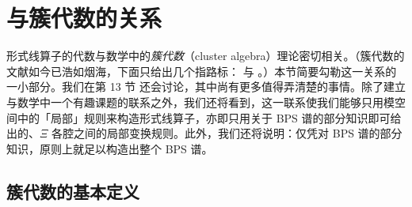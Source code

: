 
\section{与簇代数的关系}
\label{sec:Cluster-Algebras}

形式线算子的代数与数学中的\emph{簇代数}（cluster algebra）理论密切相关。（簇代数的文献如今已浩如烟海，下面只给出几个指路标：\cite{MR1887642,MR2132323,cluster-intro} 与 \cite{cluster-portal}。）本节简要勾勒这一关系的一小部分。我们在第 13 节%
还会讨论，其中尚有更多值得弄清楚的事情。除了建立与数学中一个有趣课题的联系之外，我们还将看到，这一联系使我们能够只用模空间中的「局部」规则来构造形式线算子，亦即只用关于 BPS 谱的部分知识即可给出的、$\Xi$ 各腔之间的局部变换规则。此外，我们还将说明：仅凭对 BPS 谱的部分知识，原则上就足以构造出整个 BPS 谱。

\subsection{簇代数的基本定义}
\label{subsec:Cluster-Defs}


